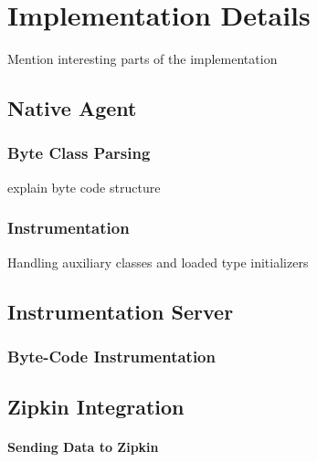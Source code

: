 \chapter{Implementation Details}
\label{chap:implementation}
Mention interesting parts of the implementation
\section{Native Agent}
\subsection{Byte Class Parsing}
explain byte code structure
\subsection{Instrumentation}
Handling auxiliary classes and loaded type initializers
\section{Instrumentation Server}
\subsection{Byte-Code Instrumentation}
\section{Zipkin Integration}
\subsubsection{Sending Data to Zipkin}

